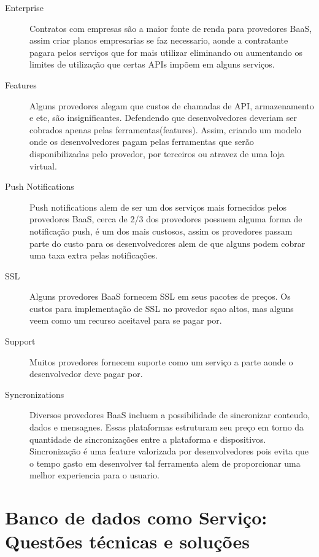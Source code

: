 \begin{description}
		\item[Enterprise] { Contratos com empresas são a maior fonte de renda para provedores BaaS, assim criar planos empresarias se faz necessario, aonde a contratante pagara pelos serviços que for mais utilizar eliminando ou aumentando os limites de utilização que certas APIs impõem em alguns serviços.}
		
		\item[Features] { Alguns provedores alegam que custos de chamadas de API, armazenamento e etc, são insignificantes. Defendendo que desenvolvedores deveriam ser cobrados apenas pelas ferramentas(features). Assim, criando um modelo onde os desenvolvedores pagam pelas ferramentas que serão disponibilizadas pelo provedor, por terceiros ou atravez de uma loja virtual.}
		
		\item[Push Notifications] { Push notifications alem de ser um dos serviços mais fornecidos pelos provedores BaaS, cerca de 2/3 dos provedores possuem alguma forma de notificação push, é um dos mais custosos, assim os provedores passam parte do custo para os desenvolvedores alem de que alguns podem cobrar uma taxa extra pelas notificações.}
		
		\item[SSL] { Alguns provedores BaaS fornecem SSL em seus pacotes de preços. Os custos para implementação de SSL no provedor sçao altos, mas alguns veem como um recurso aceitavel para se pagar por. }
		
		\item[Support] { Muitos provedores fornecem suporte como um serviço a parte aonde o desenvolvedor deve pagar por. }
		
		\item[Syncronizations] { Diversos provedores BaaS incluem a possibilidade de sincronizar conteudo, dados e mensagnes. Essas plataformas estruturam seu preço em torno da quantidade de sincronizações entre a plataforma e dispositivos. Sincronização é uma feature valorizada por desenvolvedores pois evita que o tempo gasto em desenvolver tal ferramenta alem de proporcionar uma melhor experiencia para o usuario. }
	\end{description}

	
\section{Banco de dados como Serviço: Questões técnicas e soluções}

